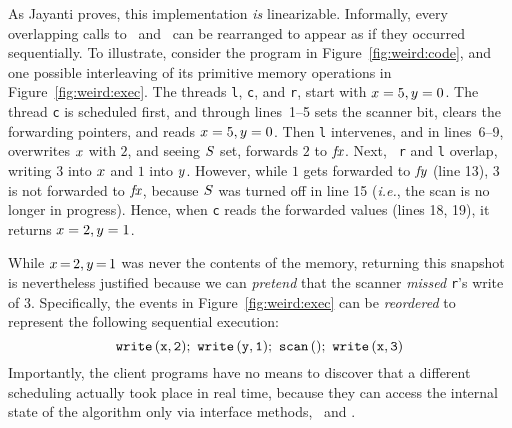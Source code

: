 \documentclass[a4paper,UKenglish]{lipics-v2016}
\newcommand{\ie}{\emph{i.e.}\xspace}
\theoremstyle{definition}
\begin{document}
As Jayanti proves, this implementation \emph{is} linearizable. Informally,
every overlapping calls to \jywrite~and \jyscan~can be rearranged to
appear as if they occurred sequentially.  To illustrate, consider the
program in Figure~\ref{fig:weird:code}, and one possible interleaving
of its primitive memory operations in Figure~\ref{fig:weird:exec}. The
threads {\tt l}, {\tt c}, and {\tt r}, start with $x = 5, y = 0$.
%
The thread {\tt c} is scheduled first, and through lines~1--5 sets the
scanner bit, clears the forwarding pointers, and reads $x = 5, y =
0$. Then {\tt l} intervenes, and in lines~6--9, overwrites
$x$ with $2$, and seeing $S$ set, forwards $2$ to $\mathit{fx}$. Next, {\tt
  r} and {\tt l} overlap, writing $3$ into $x$ and $1$ into
$y$. However, while $1$ gets forwarded to $\mathit{fy}$ (line 13), $3$ is not
forwarded to $\mathit{fx}$, because $S$ was turned off in line 15 (\ie, the
scan is no longer in progress). Hence, when {\tt c} reads the
forwarded values (lines 18, 19), it returns $x = 2, y = 1$.

While $x\,{=}\,2, y\,{=}\,1$ was never the contents of the memory,
returning this snapshot is nevertheless justified because we can
\emph{pretend} that the scanner \emph{missed} {\tt r}'s write of
$3$. Specifically, the events in Figure~\ref{fig:weird:exec} can be
\emph{reordered} to represent the following sequential execution:
%
\begin{equation}
\hfill \mathtt{write\, (x, 2);\ write\, (y,1);\ scan\, ();\ write\, (x,
  3)}\hfill \label{eq:lin}
\end{equation}
%
Importantly, the client programs have no means to discover that a
different scheduling actually took place in real time, because they
can access the internal state of the algorithm only via interface
methods, \jywrite~and \jyscan.
\end{document}
